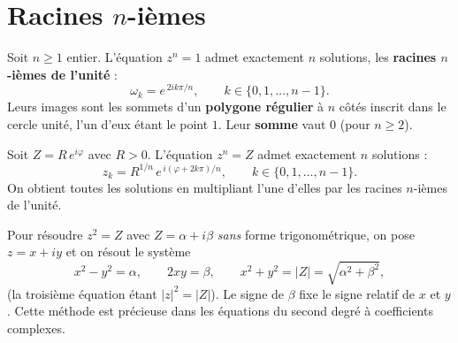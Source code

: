 \section{Racines $n$-ièmes}

\begin{theoreme}
Soit $n\ge1$ entier. L'équation $z^{n}=1$ admet exactement $n$ solutions, les \textbf{racines
$n$-ièmes de l'unité} :
\[
\omega_{k}=e^{\,2ik\pi/n},\qquad k\in\{0,1,\dots,n-1\}.
\]
Leurs images sont les sommets d'un \textbf{polygone régulier} à $n$ côtés inscrit dans le cercle
unité, l'un d'eux étant le point $1$. Leur \textbf{somme} vaut $0$ (pour $n\ge2$).
\end{theoreme}

\begin{theoreme}
Soit $Z=R\,e^{i\varphi}$ avec $R>0$. L'équation $z^{n}=Z$ admet exactement $n$ solutions :
\[
z_{k}=R^{1/n}\,e^{\,i(\varphi+2k\pi)/n},\qquad k\in\{0,1,\dots,n-1\}.
\]
On obtient toutes les solutions en multipliant l'une d'elles par les racines $n$-ièmes de l'unité.
\end{theoreme}

\begin{illus}
\end{illus}

\begin{definition}
Pour résoudre $z^{2}=Z$ avec $Z=\alpha+i\beta$ \emph{sans} forme trigonométrique, on pose
$z=x+iy$ et on résout le système
\[
x^{2}-y^{2}=\alpha,\qquad 2xy=\beta,\qquad x^{2}+y^{2}=|Z|=\sqrt{\alpha^{2}+\beta^{2}},
\]
(la troisième équation étant $|z|^{2}=|Z|$). Le signe de $\beta$ fixe le signe relatif de $x$ et
$y$. Cette méthode est précieuse dans les équations du second degré à coefficients complexes.
\end{definition}

